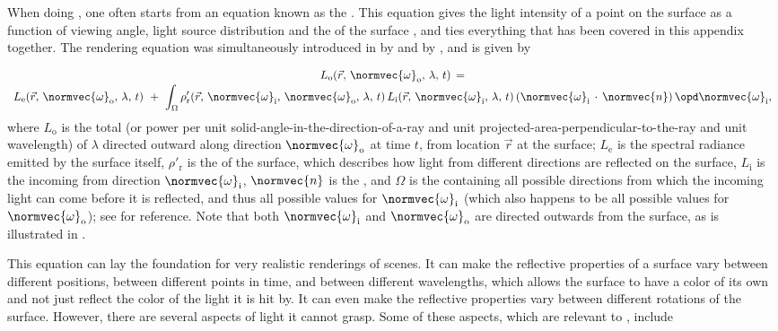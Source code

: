 When doing , one often starts from an equation known as the . This equation gives the light intensity of a point on the surface as a function of viewing angle, light source distribution and the \BRDF of the surface \citep{Nicodemus1965}, and ties everything that has been covered in this appendix together. The rendering equation was simultaneously introduced in  by \citet{Immel1986} and by \citet{Kajiya1986}, and is given by
%
\begin{equation} \label{eq:rendering_equation_original}
\renewcommand*{\arraystretch}{1.5}
\begin{array}{c}
L_{\text{o}}(\vec{r},\,\normvec{\omega}_{\text{o}},\, \lambda,\, t) \,= \\
\displaystyle L_{\text{e}}(\vec{r},\, \normvec{\omega}_{\text{o}},\, \lambda,\, t) \ + \ \int_\Omega \rho'_{\text{r}}(\vec{r},\, \normvec{\omega}_{\text{i}},\, \normvec{\omega}_{\text{o}},\, \lambda,\, t)\, L_{\text{i}}(\vec{r},\, \normvec{\omega}_{\text{i}},\, \lambda,\, t)\, (\normvec{\omega}_{\text{i}}\,\cdot\,\normvec{n})\, \opd \normvec{\omega}_{\text{i}},
\end{array}
\end{equation}
%
where $L_{\text{o}}$ is the total  (or power per unit solid-angle-in-the-direction-of-a-ray and unit projected-area-perpendicular-to-the-ray and unit wavelength) of  $\lambda$ directed outward along direction $\normvec{\omega}_{\text{o}}$ at time $t$, from location $\vec{r}$ at the surface; $L_{\text{e}}$ is the spectral radiance emitted by the surface itself, $\rho'_{\text{r}}$ is the \BRDF of the surface, which describes how light from different directions are reflected on the surface, $L_{\text{i}}$ is the  incoming from direction $\normvec{\omega}_{\text{i}}$, $\normvec{n}$ is the , and $\Omega$ is the  containing all possible directions from which the incoming light can come before it is reflected, and thus all possible values for $\normvec{\omega}_{\text{i}}$ (which also happens to be all possible values for $\normvec{\omega}_{\text{o}}$); see  for reference. Note that both $\normvec{\omega}_{\text{i}}$ and $\normvec{\omega}_{\text{o}}$ are directed outwards from the surface, as is illustrated in .

This equation can lay the foundation for very realistic renderings of \threedimensional scenes. It can make the reflective properties of a surface vary between different positions, between different points in time, and between different wavelengths, which allows the surface to have a color of its own and not just reflect the color of the light it is hit by. It can even make the reflective properties vary between different rotations of the surface. However, there are several aspects of light it cannot grasp. Some of these aspects, which are relevant to \surfacewaterrendering, include

